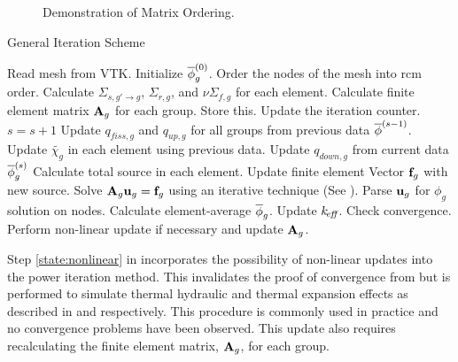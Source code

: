     \begin{figure}
      \centering
      \hspace{0.1in}
      \caption{Demonstration of  Matrix Ordering.}
      \label{fig:sparsity_pattern}
    \end{figure}
    
    \begin{algorithm}
      \caption{General Iteration Scheme}
      \label{algorithm:general}
      \begin{algorithmic}[1]
      \State Read mesh from VTK.
      \State Initialize $\overline{\phi}_g^{(0)}$.
      \State Order the nodes of the mesh into \gls{rcm} order.
        \label{state:rcm}
      \State Calculate $\Sigma_{s,g'\rightarrow g}$, $\Sigma_{r,g}$, and 
        $\nu \Sigma_{f,g}$ for each element.
      \State Calculate finite element matrix $\mathbf{A}_g$ for each group. Store this. 
        \label{state:fem_matrix}
        \State Update the iteration counter. $s=s+1$
        \State Update $q_{fiss,g}$ and $q_{up,g}$ for all groups from previous 
          data $\overline{\phi}^{(s-1)}$.
        \State Update $\widetilde{\chi_g}$ in each element using previous data.
          \label{state:chi_collapse}
          \State Update $q_{down,g}$ from current data $\overline{\phi}_g^{(s)}$
          \State Calculate total source in each element.
          \State Update finite element Vector $\mathbf{f}_g$ with new source.
            \label{state:fem_vector}
          \State Solve $\mathbf{A}_g \mathbf{u}_g = \mathbf{f}_g$ using an iterative technique (See
            ).
          \State Parse $\mathbf{u}_g$ for $\phi_g$ solution on nodes.
          \State Calculate element-average $\overline{\phi}_g$.
        \EndFor
        \State Update $k_{\!\mbox{\scriptsize \em eff}}$.
        \State Check convergence.
        \State Perform non-linear update if necessary and update $\mathbf{A}_g$. 
          \label{state:nonlinear}
      \EndWhile
      \end{algorithmic}
    \end{algorithm}

    Step \ref{state:nonlinear} in  incorporates
    the possibility of non-linear updates into the power iteration method. This
    invalidates the proof of convergence from  but is
    performed to simulate thermal hydraulic and thermal expansion effects as
    described in  and 
    respectively. This procedure is commonly used in practice and no convergence 
    problems have been observed. This update also requires recalculating the 
    finite element matrix, $\mathbf{A}_g$, for each group.
    

